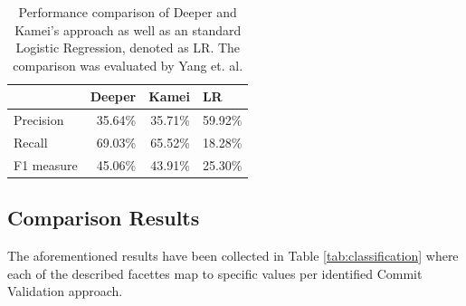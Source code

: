 \begin{table}[t]
	\centering
	\caption{Performance comparison of Deeper and Kamei's approach as well as an standard Logistic Regression, denoted as LR. The comparison was evaluated by Yang et. al. \cite{Yang2015}}
	\begin{tabular}{@{}lrrr@{}}
		\toprule
		& \multicolumn{1}{l}{Deeper} & \multicolumn{1}{l}{Kamei} & \multicolumn{1}{l}{LR} \\ \midrule
		Precision  & 35.64\%                    & 35.71\%                   & 59.92\%                \\
		Recall     & 69.03\%                    & 65.52\%                   & 18.28\%                \\
		F1 measure & 45.06\%                    & 43.91\%                   & 25.30\%                \\ \bottomrule
	\end{tabular}
	\label{tab:perfdeeper}
\end{table}



\subsection{Comparison Results}

The aforementioned results have been collected in Table \ref{tab:classification} where each of the described facettes map to specific values per identified Commit Validation approach.


